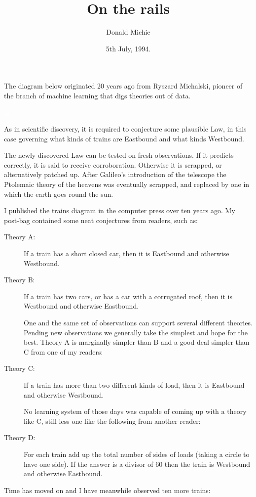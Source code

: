

\title{On the rails}
\author{Donald Michie}
\date{5th July, 1994.}
\maketitle

The diagram below originated 20 years ago from Ryszard Michalski, 
pioneer of the branch of machine learning that digs theories out of 
data. 

\centerline{\epsfxsize=\textwidth{}}

As in scientific discovery, it is required to conjecture some 
plausible Law, in this case  governing what kinds of trains are 
Eastbound and what kinds Westbound. 

The newly discovered Law can be tested on fresh observations. If it 
predicts correctly, it is said to receive corroboration.  Otherwise it 
is scrapped, or alternatively patched up. After Galileo's 
introduction of the  telescope the Ptolemaic theory of the heavens was
eventually scrapped, and replaced by one in which the earth goes 
round the sun. 

I published the trains diagram in the  computer press over ten years 
ago. My post-bag contained some neat conjectures from readers, such as: 
\begin{description}
\item[Theory A:] If a train has a short closed car, then it is Eastbound and 
otherwise Westbound. 

\item[Theory B:] If a train has two cars, or has a car with a corrugated roof, 
then it is Westbound and otherwise Eastbound. 

One and the same set of observations can support several different 
theories. Pending new observations we generally take the simplest and 
hope for the best. Theory A is marginally simpler than B and a good 
deal simpler than C from one of my readers: 

\item[Theory C:] If a train has more than two different kinds of load, then it 
is Eastbound and otherwise Westbound. 

No learning system of those days was capable of coming up with a theory
 like C, still less one like the following from another reader: 
 
\item[Theory D:] For each train add up the total number of sides of loads 
(taking a circle to have one side). If the answer is a divisor of 60 
then the train is Westbound and otherwise Eastbound. 
\end{description}
Time has moved on and I have meanwhile observed ten more trains:

